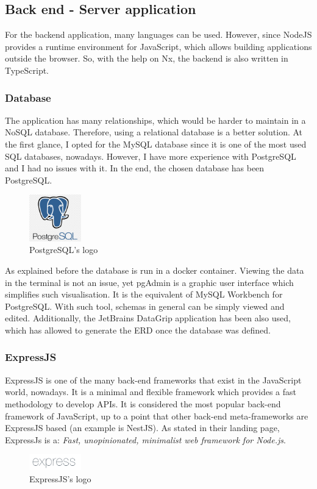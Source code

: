 \documentclass[a4paper, 12pt, oneside]{book}
\begin{document}
\subsection{Back end - Server application}
For the backend application, many languages can be used. However, since NodeJS provides a runtime environment for JavaScript, which allows building applications outside the browser. So, with the help on Nx, the backend is also written in TypeScript.
\subsubsection{Database}
The application has many relationships, which would be harder to maintain in a NoSQL database. Therefore, using a relational database is a better solution. At the first glance, I opted for the MySQL database since it is one of the most used SQL databases, nowadays. However, I have more experience with PostgreSQL and I had no issues with it. In the end, the chosen database has been PostgreSQL.
\begin{figure}[H]
	\centering
	\includegraphics[width=0.2\textwidth]{assets/postgres-logo.png}
	\caption{PostgreSQL's logo}
\end{figure}
As explained before the database is run in a docker container. Viewing the data in the terminal is not an issue, yet pgAdmin is a graphic user interface which simplifies such visualisation. It is the equivalent of MySQL Workbench for PostgreSQL. With such tool, schemas in general can be simply viewed and edited. Additionally, the JetBrains DataGrip application has been also used, which has allowed to generate the ERD once the database was defined.
\subsubsection{ExpressJS}
ExpressJS is one of the many back-end frameworks that exist in the JavaScript world, nowadays. It is a minimal and flexible framework which provides a fast methodology to develop APIs. It is considered the most popular back-end framework of JavaScript, up to a point that other back-end meta-frameworks are ExpressJS based (an example is NestJS). As stated in their landing page, ExpressJs is a: \emph{Fast, unopinionated, minimalist web framework for Node.js}.
\begin{figure}[H]
	\centering
	\includegraphics[width=0.2\textwidth]{assets/express-logo.png}
	\caption{ExpressJS's logo}
\end{figure}
\end{document}
